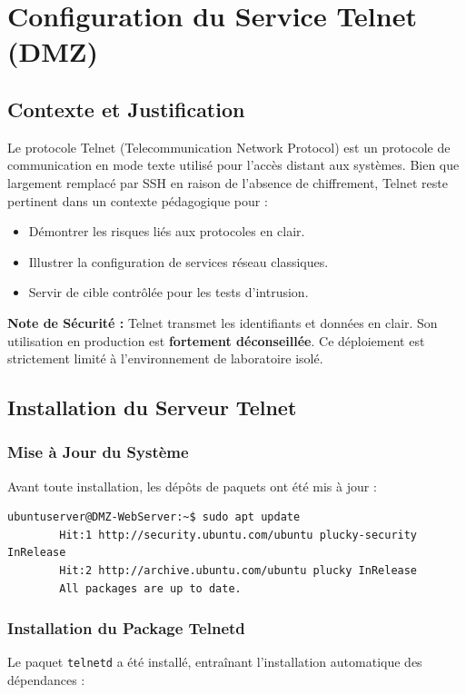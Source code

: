 \documentclass[12pt,a4paper,openany]{report}
\begin{document}
	\chapter{Configuration du Service Telnet (DMZ)}
	
	\section{Contexte et Justification}
	Le protocole Telnet (Telecommunication Network Protocol) est un protocole de communication en mode texte utilisé pour l'accès distant aux systèmes. Bien que largement remplacé par SSH en raison de l'absence de chiffrement, Telnet reste pertinent dans un contexte pédagogique pour :
	
	\begin{itemize}
		\item Démontrer les risques liés aux protocoles en clair.
		\item Illustrer la configuration de services réseau classiques.
		\item Servir de cible contrôlée pour les tests d'intrusion.
	\end{itemize}
	
	\textbf{Note de Sécurité :} Telnet transmet les identifiants et données en clair. Son utilisation en production est \textbf{fortement déconseillée}. Ce déploiement est strictement limité à l'environnement de laboratoire isolé.
	
	\section{Installation du Serveur Telnet}
	
	\subsection{Mise à Jour du Système}
	Avant toute installation, les dépôts de paquets ont été mis à jour :
	
	\begin{lstlisting}[caption=Mise à jour des paquets système]
		ubuntuserver@DMZ-WebServer:~$ sudo apt update
		Hit:1 http://security.ubuntu.com/ubuntu plucky-security InRelease
		Hit:2 http://archive.ubuntu.com/ubuntu plucky InRelease
		All packages are up to date.
	\end{lstlisting}
	
	\subsection{Installation du Package Telnetd}
	Le paquet \texttt{telnetd} a été installé, entraînant l'installation automatique des dépendances :
	
\end{document}
